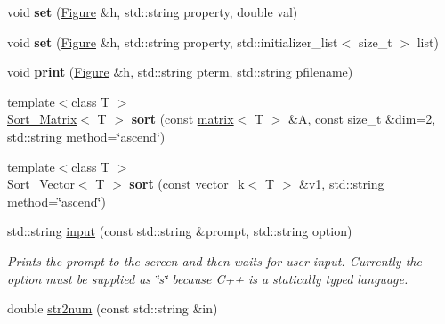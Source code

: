 \begin{DoxyCompactItemize}
\item 
\hypertarget{namespacekeycpp_afcd6ae07fc18f5374868fe314f00108c}{void {\bfseries set} (\hyperlink{classkeycpp_1_1_figure}{Figure} \&h, std\-::string property, double val)}\label{namespacekeycpp_afcd6ae07fc18f5374868fe314f00108c}

\item 
\hypertarget{namespacekeycpp_ae67eb981ff22ef79a4ee90a9a40ae21f}{void {\bfseries set} (\hyperlink{classkeycpp_1_1_figure}{Figure} \&h, std\-::string property, std\-::initializer\-\_\-list$<$ size\-\_\-t $>$ list)}\label{namespacekeycpp_ae67eb981ff22ef79a4ee90a9a40ae21f}

\item 
\hypertarget{namespacekeycpp_af9dec3da4533a1db21a6c6c4fe8e740a}{void {\bfseries print} (\hyperlink{classkeycpp_1_1_figure}{Figure} \&h, std\-::string pterm, std\-::string pfilename)}\label{namespacekeycpp_af9dec3da4533a1db21a6c6c4fe8e740a}

\item 
\hypertarget{namespacekeycpp_abe567d1c5cdf91722dfbe5da89e859e8}{{\footnotesize template$<$class T $>$ }\\\hyperlink{structkeycpp_1_1_sort___matrix}{Sort\-\_\-\-Matrix}$<$ T $>$ {\bfseries sort} (const \hyperlink{classkeycpp_1_1matrix}{matrix}$<$ T $>$ \&A, const size\-\_\-t \&dim=2, std\-::string method=\char`\"{}ascend\char`\"{})}\label{namespacekeycpp_abe567d1c5cdf91722dfbe5da89e859e8}

\item 
\hypertarget{namespacekeycpp_a0ab724c8ffc30f7beac54280a4ee81eb}{{\footnotesize template$<$class T $>$ }\\\hyperlink{structkeycpp_1_1_sort___vector}{Sort\-\_\-\-Vector}$<$ T $>$ {\bfseries sort} (const \hyperlink{classkeycpp_1_1vector__k}{vector\-\_\-k}$<$ T $>$ \&v1, std\-::string method=\char`\"{}ascend\char`\"{})}\label{namespacekeycpp_a0ab724c8ffc30f7beac54280a4ee81eb}

\item 
\hypertarget{namespacekeycpp_aba69db64fe38ad271de1939d3f1a5520}{std\-::string \hyperlink{namespacekeycpp_aba69db64fe38ad271de1939d3f1a5520}{input} (const std\-::string \&prompt, std\-::string option)}\label{namespacekeycpp_aba69db64fe38ad271de1939d3f1a5520}

\begin{DoxyCompactList}\small\item\em Prints the prompt to the screen and then waits for user input. Currently the option must be supplied as \char`\"{}s\char`\"{} because C++ is a statically typed language. \end{DoxyCompactList}\item 
\hypertarget{namespacekeycpp_a4bca7924aad17a920f2f5f0606e6d9a9}{double \hyperlink{namespacekeycpp_a4bca7924aad17a920f2f5f0606e6d9a9}{str2num} (const std\-::string \&in)}\label{namespacekeycpp_a4bca7924aad17a920f2f5f0606e6d9a9}


\end{DoxyCompactItemize}
